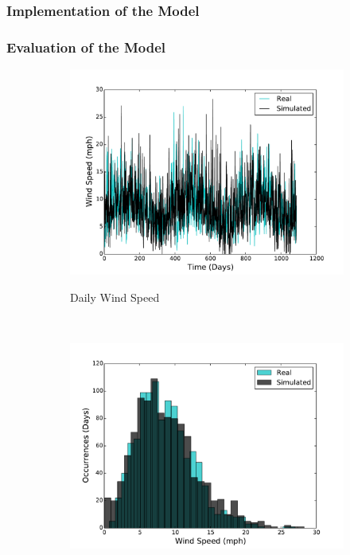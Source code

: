 \documentclass[11pt, letterpaper]{article}
\begin{document}
\subsubsection{Implementation of the Model}

\subsubsection{Evaluation of the Model}

\begin{figure}[H]
  \centering
  \begin{subfigure}[b]{0.45\textwidth}
    \includegraphics[width=\textwidth]{figures/daily_wind_speeds.pdf}
    \label{fig:analysis-raw}
    \caption{Daily Wind Speed}
  \end{subfigure}
  ~
  \begin{subfigure}[b]{0.45\textwidth}
    \includegraphics[width=\textwidth]{figures/daily_wind_speed_hist.pdf}

\end{subfigure}
\end{figure}
\end{document}
